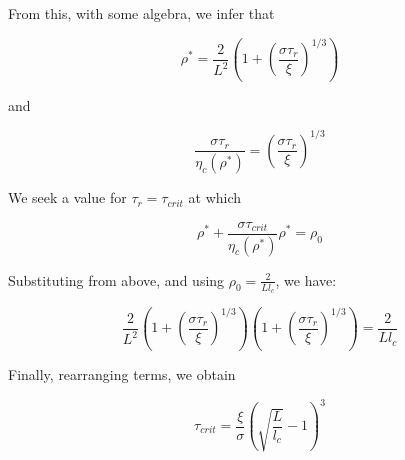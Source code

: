 \documentclass[10pt,letterpaper]{article}
\begin{document}
From this, with some algebra, we infer that

\begin{equation}
\label{drho_4}
\rho^* = \frac{2}{L^2}\left ( 1 + \left( \frac{\sigma\tau_r}{\xi}\right )^{1/3} \right )
\end{equation}

and 

\begin{equation}
\label{drho_5}
\frac{\sigma\tau_r}{\eta_c(\rho^*)} =  \left( \frac{\sigma\tau_r}{\xi}\right )^{1/3} 
\end{equation}

We seek a value for $\tau_r=\tau_{crit}$ at which


\begin{equation}
\label{drho_6}
\rho^* + \frac{\sigma\tau_{crit}}{\eta_c(\rho^*)}\rho^* =  \rho_0
\end{equation}

Substituting from above, and using $\rho_0=\frac{2}{L l_c}$, we have:

\begin{equation}
\label{drho_7}
\frac{2}{L^2}\left ( 1 + \left( \frac{\sigma\tau_r}{\xi}\right )^{1/3}  \right )
\left ( 1 + \left( \frac{\sigma\tau_r}{\xi}\right )^{1/3}  \right )
= \frac{2}{L l_c}
\end{equation}

Finally, rearranging terms, we obtain

\begin{equation}
\label{drho_8}
\tau_{crit}=\frac{\xi}{\sigma}\left( \sqrt{\frac{L}{l_c}}-1\right )^3
\end{equation}
\end{document}
